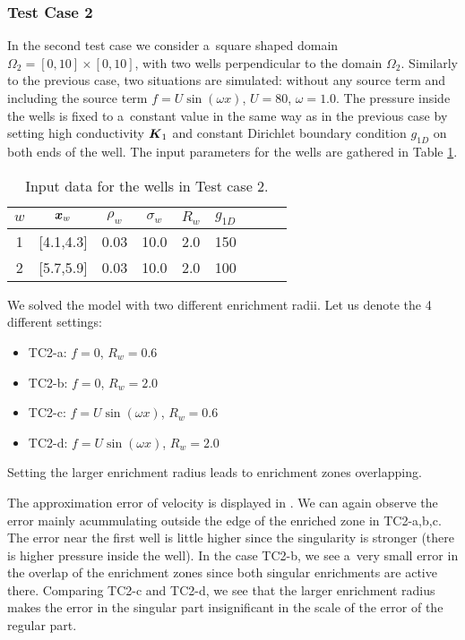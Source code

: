 \subsubsection{Test Case 2}
In the second test case we consider a~square shaped domain $\Omega_2=[0,10]\times[0,10]$,
with two wells perpendicular to the domain $\Omega_2$.
Similarly to the previous case, two situations are simulated: without any source term and
including the source term $f=U\sin(\omega x)$, $U=80$, $\omega=1.0$.
The pressure inside the wells is fixed to a~constant value in the same way as in the previous case 
by setting high conductivity $\mathbf{\boldsymbol{K}}_1$ and constant Dirichlet boundary condition $g_{1D}$ on both ends of the well.
The input parameters for the wells are gathered in Table \ref{tab:tc2_data}.
%
\begin{table}[!hb]
\begin{center}
\begin{tabular}{ccccccccc}
\toprule
$w$ & $\mathbf{\boldsymbol{x}}_w$  & $\rho_w$ & $\sigma_w$ & $R_w$ & $g_{1D}$\\
\midrule
1& [4.1,4.3] & 0.03 & 10.0 & 2.0 & 150 \\
2& [5.7,5.9] & 0.03 & 10.0 & 2.0 & 100 \\
\bottomrule
\end{tabular}
\caption{Input data for the wells in Test case 2.}
\label{tab:tc2_data}
\end{center}
\end{table}

We solved the model with two different enrichment radii. Let us denote the 4 different settings:
\begin{itemize}
    \item TC2-a: $f=0$, $R_w=0.6$
    \item TC2-b: $f=0$, $R_w=2.0$
    \item TC2-c: $f=U\sin(\omega x)$, $R_w=0.6$
    \item TC2-d: $f=U\sin(\omega x)$, $R_w=2.0$
\end{itemize}
Setting the larger enrichment radius leads to enrichment zones overlapping.

The approximation error of velocity is displayed in . We can again observe
the error mainly acummulating outside the edge of the enriched zone in TC2-a,b,c.
The error near the first well is little higher since the singularity is stronger (there is higher pressure inside the well).
In the case TC2-b, we see a~very small error in the overlap of the enrichment zones
since both singular enrichments are active there.
Comparing TC2-c and TC2-d, we see that the larger enrichment radius makes the error in the singular part insignificant
in the scale of the error of the regular part.

